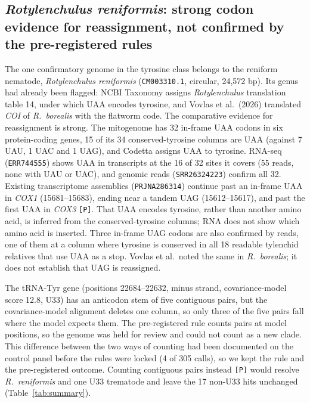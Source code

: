 \documentclass[11pt, a4paper]{article}
\begin{document}
\subsection{\textit{Rotylenchulus reniformis}: strong codon evidence for reassignment, not confirmed by the pre-registered rules}\label{sec:roty}
The one confirmatory genome in the tyrosine class belongs to the reniform nematode, \textit{Rotylenchulus reniformis} (\texttt{CM003310.1}, circular, 24,572 bp). Its genus had already been flagged: NCBI Taxonomy assigns \textit{Rotylenchulus} translation table 14, under which UAA encodes tyrosine, and Vovlas et al.\ (2026) translated \textit{COI} of \textit{R.\ borealis} with the flatworm code. The comparative evidence for reassignment is strong. The mitogenome has 32 in-frame UAA codons in six protein-coding genes, 15 of its 34 conserved-tyrosine columns are UAA (against 7 UAU, 1 UAC and 1 UAG), and Codetta assigns UAA to tyrosine. RNA-seq (\texttt{ERR744555}) shows UAA in transcripts at the 16 of 32 sites it covers (55 reads, none with UAU or UAC), and genomic reads (\texttt{SRR26324223}) confirm all 32. Existing transcriptome assemblies (\texttt{PRJNA286314}) continue past an in-frame UAA in \textit{COX1} (15681--15683), ending near a tandem UAG (15612--15617), and past the first UAA in \textit{COX3} \texttt{[P]}. That UAA encodes tyrosine, rather than another amino acid, is inferred from the conserved-tyrosine columns; RNA does not show which amino acid is inserted. Three in-frame UAG codons are also confirmed by reads, one of them at a column where tyrosine is conserved in all 18 readable tylenchid relatives that use UAA as a stop. Vovlas et al.\ noted the same in \textit{R.\ borealis}; it does not establish that UAG is reassigned.

The tRNA-Tyr gene (positions 22684--22632, minus strand, covariance-model score 12.8, U33) has an anticodon stem of five contiguous pairs, but the covariance-model alignment deletes one column, so only three of the five pairs fall where the model expects them. The pre-registered rule counts pairs at model positions, so the genome was held for review and could not count as a new clade. This difference between the two ways of counting had been documented on the control panel before the rules were locked (4 of 305 calls), so we kept the rule and the pre-registered outcome. Counting contiguous pairs instead \texttt{[P]} would resolve \textit{R.\ reniformis} and one U33 trematode and leave the 17 non-U33 hits unchanged (Table~\ref{tab:summary}).
\end{document}
